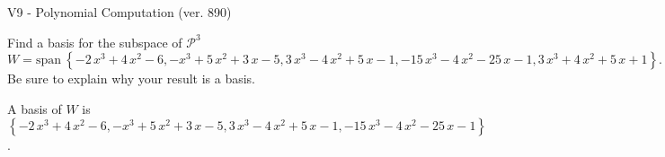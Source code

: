 \begin{exercise}
  \begin{exerciseTitle}V9 - Polynomial Computation (ver. 890)\end{exerciseTitle}
  \begin{exerciseStatement}
    Find a basis for the subspace of \(\mathcal{P}^3\) 
\[W=\mathrm{span}\ \left\{-2 \, x^{3} + 4 \, x^{2} - 6 , -x^{3} + 5 \, x^{2} + 3 \, x - 5 , 3 \, x^{3} - 4 \, x^{2} + 5 \, x - 1 , -15 \, x^{3} - 4 \, x^{2} - 25 \, x - 1 , 3 \, x^{3} + 4 \, x^{2} + 5 \, x + 1\right\}.\]
 Be sure to explain why your result is a basis.


  \end{exerciseStatement}
  \begin{exerciseAnswer}
   A basis of \(W\) is  \(\left\{-2 \, x^{3} + 4 \, x^{2} - 6 , -x^{3} + 5 \, x^{2} + 3 \, x - 5 , 3 \, x^{3} - 4 \, x^{2} + 5 \, x - 1 , -15 \, x^{3} - 4 \, x^{2} - 25 \, x - 1\right\}\).
  


  \end{exerciseAnswer}
\end{exercise}